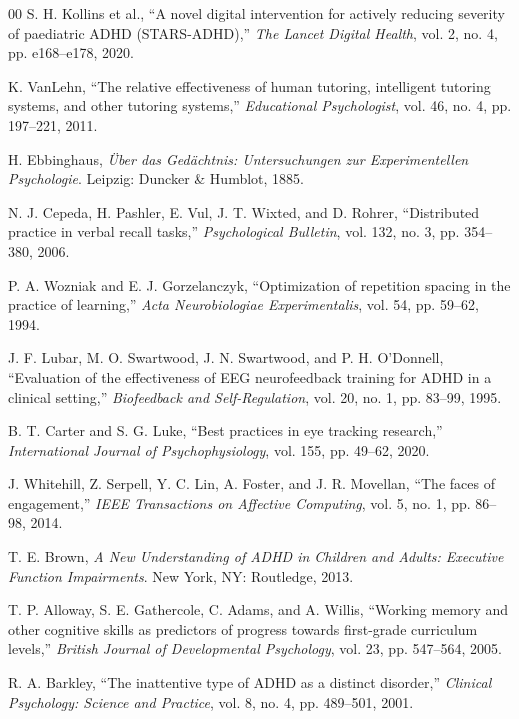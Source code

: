 \documentclass[conference]{IEEEtran}
\begin{document}
\begin{thebibliography}{00}
S. H. Kollins et al., ``A novel digital intervention for actively reducing severity of paediatric ADHD (STARS-ADHD),'' \textit{The Lancet Digital Health}, vol. 2, no. 4, pp. e168--e178, 2020.

K. VanLehn, ``The relative effectiveness of human tutoring, intelligent tutoring systems, and other tutoring systems,'' \textit{Educational Psychologist}, vol. 46, no. 4, pp. 197--221, 2011.

H. Ebbinghaus, \textit{Über das Gedächtnis: Untersuchungen zur Experimentellen Psychologie}. Leipzig: Duncker \& Humblot, 1885.

N. J. Cepeda, H. Pashler, E. Vul, J. T. Wixted, and D. Rohrer, ``Distributed practice in verbal recall tasks,'' \textit{Psychological Bulletin}, vol. 132, no. 3, pp. 354--380, 2006.

P. A. Wozniak and E. J. Gorzelanczyk, ``Optimization of repetition spacing in the practice of learning,'' \textit{Acta Neurobiologiae Experimentalis}, vol. 54, pp. 59--62, 1994.

J. F. Lubar, M. O. Swartwood, J. N. Swartwood, and P. H. O'Donnell, ``Evaluation of the effectiveness of EEG neurofeedback training for ADHD in a clinical setting,'' \textit{Biofeedback and Self-Regulation}, vol. 20, no. 1, pp. 83--99, 1995.

B. T. Carter and S. G. Luke, ``Best practices in eye tracking research,'' \textit{International Journal of Psychophysiology}, vol. 155, pp. 49--62, 2020.

J. Whitehill, Z. Serpell, Y. C. Lin, A. Foster, and J. R. Movellan, ``The faces of engagement,'' \textit{IEEE Transactions on Affective Computing}, vol. 5, no. 1, pp. 86--98, 2014.

T. E. Brown, \textit{A New Understanding of ADHD in Children and Adults: Executive Function Impairments}. New York, NY: Routledge, 2013.

T. P. Alloway, S. E. Gathercole, C. Adams, and A. Willis, ``Working memory and other cognitive skills as predictors of progress towards first-grade curriculum levels,'' \textit{British Journal of Developmental Psychology}, vol. 23, pp. 547--564, 2005.

R. A. Barkley, ``The inattentive type of ADHD as a distinct disorder,'' \textit{Clinical Psychology: Science and Practice}, vol. 8, no. 4, pp. 489--501, 2001.


\end{thebibliography}
\end{document}

